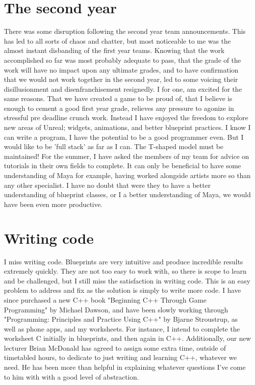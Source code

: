 \documentclass{scrartcl}
\begin{document}
\section*{The second year}

There was some disruption following the second year team announcements. This has led to all sorts of chaos and chatter, but most noticeable to me was the almost instant disbanding of the first year teams. Knowing that the work accomplished so far was most probably adequate to pass, that the grade of the work will have no impact upon any ultimate grades, and to have confirmation that we would not work together in the second year, led to some voicing their disillusionment and disenfranchisement resignedly. I for one, am excited for the same reasons. That we have created a game to be proud of, that I believe is enough to cement a good first year grade, relieves any pressure to agonize in stressful pre deadline crunch work. Instead I have enjoyed the freedom to explore new areas of Unreal; widgets, animations, and better blueprint practices. I know I can write a program, I have the potential to be a good programmer even. But I would like to be 'full stack' as far as I can. The T-shaped model must be maintained! For the summer, I have asked the members of my team for advice on tutorials in their own fields to complete. It can only be beneficial to have some understanding of Maya for example, having worked alongside artists more so than any other specialist. I have no doubt that were they to have a better understanding of blueprint classes, or I a better understanding of Maya, we would have been even more productive.

\section*{Writing code}

I miss writing code. Blueprints are very intuitive and produce incredible results extremely quickly. They are not too easy to work with, so there is scope to learn and be challenged, but I still miss the satisfaction in writing code. This is an easy problem to address and fix as the solution is simply to write more code. I have since purchased a new C++ book "Beginning C++ Through Game Programming" by Michael Dawson, and have been slowly working through "Programming: Principles and Practice Using C++" by Bjarne Stroustrup, as well as phone apps, and my worksheets. For instance, I intend to complete the worksheet C initially in blueprints, and then again in C++. Additionally, our new lecturer Brian McDonald has agreed to assign some extra time, outside of timetabled hours, to dedicate to just writing and learning C++, whatever we need. He has been more than helpful in explaining whatever questions I've come to him with with a good level of abstraction.
\end{document}
